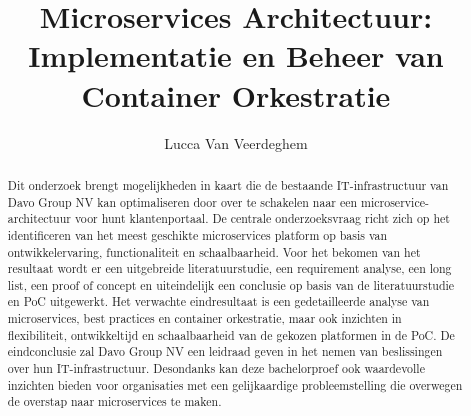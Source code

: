 \documentclass{hogent-article}
\title{Microservices Architectuur: Implementatie en Beheer van Container Orkestratie }
\author{Lucca Van Veerdeghem}
\begin{document}
\begin{abstract}
Dit onderzoek brengt mogelijkheden in kaart die de bestaande IT-infrastructuur van Davo Group NV kan optimaliseren door over te schakelen naar een microservice-architectuur voor hunt klantenportaal. De centrale onderzoeksvraag richt zich op het identificeren van het meest geschikte microservices platform op basis van ontwikkelervaring, functionaliteit en schaalbaarheid. Voor het bekomen van het resultaat wordt er een uitgebreide literatuurstudie, een requirement analyse, een long list, een proof of concept en uiteindelijk een conclusie op basis van de literatuurstudie en PoC uitgewerkt. Het verwachte eindresultaat is een gedetailleerde analyse van microservices, best practices en container orkestratie, maar ook inzichten in flexibiliteit, ontwikkeltijd en schaalbaarheid van de gekozen platformen in de PoC. De eindconclusie zal Davo Group NV een leidraad geven in het nemen van beslissingen over hun IT-infrastructuur. Desondanks kan deze bachelorproef ook waardevolle inzichten bieden voor organisaties met een gelijkaardige probleemstelling die overwegen de overstap naar microservices te maken.
    
\end{abstract}

\tableofcontents



\printbibliography[heading=bibintoc]
\end{document}
